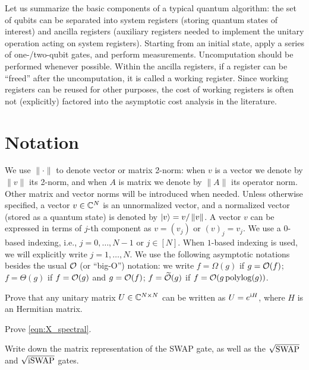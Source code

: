 Let us summarize the basic components of a typical quantum algorithm: the set of qubits can be separated into system registers (storing quantum states of interest) and ancilla registers (auxiliary registers needed to implement the unitary operation acting on system registers). Starting from an initial state, apply a series of one-/two-qubit gates, and perform measurements. Uncomputation should be performed whenever possible. Within the ancilla registers, if a register can be ``freed'' after the uncomputation, it is called a working register. Since  working registers can be reused for other purposes, the cost of  working registers is often not (explicitly) factored into the asymptotic cost analysis in the literature.

\section{Notation}



We use $\|\cdot\|$ to denote vector or matrix 2-norm: when $v$ is a vector we denote by $\|v\|$ its 2-norm, and when $A$ is matrix we denote by $\|A\|$ its operator norm. 
Other matrix and vector norms will be introduced when needed.
Unless otherwise specified, a vector $v\in\mathbb{C}^N$ is an unnormalized vector, and a normalized vector (stored as a quantum state) is denoted by $\ket{v}=v/\left\lVert v\right\rVert$.
A vector $v$ can be expressed in terms of $j$-th component as $v=(v_j)$ or $(v)_j=v_j$. We use a $0$-based indexing, i.e., $j=0,\ldots,N-1$ or $j\in [N]$. When $1$-based indexing is used, we will explicitly write $j=1,\ldots,N$.
We use the following asymptotic notations besides the usual $\mathcal{O}$ (or ``big-O'') notation: 
we write $f=\Omega(g)$ if $g=\mathcal{O}(f)$; $f=\Theta(g)$ if $f=\mathcal{O}(g)$ and $g=\mathcal{O}(f)$; $f=\widetilde{\mathcal{O}}(g)$ if $f=\mathcal{O}(g\operatorname{polylog}(g))$. 



\vspace{2em}
\begin{exer}\label{exer:unitary}
  Prove that any unitary matrix $U\in \mathbb{C}^{N\times N}$ can be written as $U=e^{\mathrm{i} H}$, where $H$ is an Hermitian matrix.
\end{exer}

\begin{exer}
  Prove \cref{eqn:X_spectral}.
\end{exer}

\begin{exer}
  Write down the matrix representation of the SWAP gate, as well as the $\sqrt{\operatorname{SWAP}}$ and $\sqrt{\operatorname{iSWAP}}$ gates.
\end{exer}

